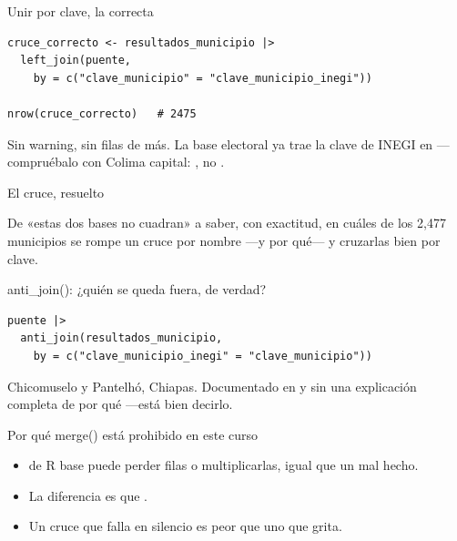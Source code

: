 \begin{frame}[fragile]{Unir por clave, la correcta}
\begin{lstlisting}
cruce_correcto <- resultados_municipio |>
  left_join(puente,
    by = c("clave_municipio" = "clave_municipio_inegi"))

nrow(cruce_correcto)   # 2475
\end{lstlisting}

  \vspace{0.6em}
  Sin warning, sin filas de más. La base electoral ya trae la clave de
  INEGI en  —compruébalo con Colima capital:
  , no .
\end{frame}

\begin{frame}{El cruce, resuelto}
  \vspace{0.4em}
  \begin{saltobox}
    De «estas dos bases no cuadran» a saber, con exactitud, en cuáles de
    los 2{,}477 municipios se rompe un cruce por nombre —y por qué— y
    cruzarlas bien por clave.
  \end{saltobox}
\end{frame}

\begin{frame}[fragile]{anti\_join(): ¿quién se queda fuera, de verdad?}
\begin{lstlisting}
puente |>
  anti_join(resultados_municipio,
    by = c("clave_municipio_inegi" = "clave_municipio"))
\end{lstlisting}

  \vspace{0.6em}
  Chicomuselo y Pantelhó, Chiapas. Documentado en  y
  sin una explicación completa de por qué —está bien decirlo.
\end{frame}

\begin{frame}{Por qué merge() está prohibido en este curso}
  \vspace{0.3em}
  \begin{itemize}\setlength{\itemsep}{0.9em}
    \item<1->  de R base puede perder filas o multiplicarlas,
          igual que un  mal hecho.
    \item<2-> La diferencia es que .
    \item<3-> Un cruce que falla en silencio es peor que uno que grita.
  \end{itemize}
\end{frame}

